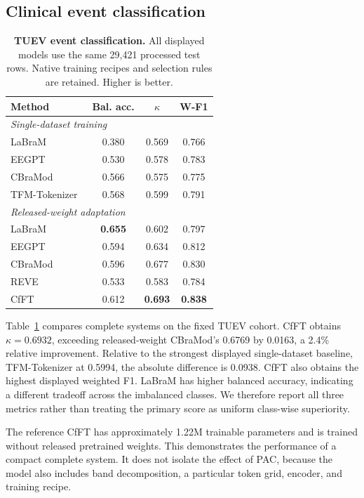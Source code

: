 \documentclass[10pt,twocolumn,letterpaper]{article}
\newcommand{\TableStyle}{\fontsize{8}{9.5}\selectfont\setlength{\tabcolsep}{3pt}\renewcommand{\arraystretch}{1.10}}
\begin{document}
\subsection{Clinical event classification}
\label{sec:main-results}
\begin{table}[t]
\centering\TableStyle
\caption{\textbf{TUEV event classification.} All displayed models use the
same 29,421 processed test rows. Native training recipes and selection
rules are retained. Higher is better.}
\label{tab:tuev}
\begin{tabular*}{\linewidth}{@{\extracolsep{\fill}}lccc@{}}
\toprule
Method & Bal. acc. & $\kappa$ & W-F1\\
\midrule
\multicolumn{4}{l}{\textit{Single-dataset training}}\\
LaBraM~\citep{jiang2024labram} & 0.380 & 0.569 & 0.766\\
EEGPT~\citep{wang2024eegpt} & 0.530 & 0.578 & 0.783\\
CBraMod~\citep{wang2025cbramod} & 0.566 & 0.575 & 0.775\\
TFM-Tokenizer~\citep{pradeepkumar2026tfm} & 0.568 & 0.599 & 0.791\\
\midrule
\multicolumn{4}{l}{\textit{Released-weight adaptation}}\\
LaBraM~\citep{jiang2024labram} & \textbf{0.655} & 0.602 & 0.797\\
EEGPT~\citep{wang2024eegpt} & 0.594 & 0.634 & 0.812\\
CBraMod~\citep{wang2025cbramod} & 0.596 & 0.677 & 0.830\\
REVE~\citep{elouahidi2025reve} & 0.533 & 0.583 & 0.784\\
\midrule
CfFT & 0.612 & \textbf{0.693} & \textbf{0.838}\\
\bottomrule
\end{tabular*}
\end{table}

Table~\ref{tab:tuev} compares complete systems on the fixed TUEV cohort.
CfFT obtains $\kappa=0.6932$, exceeding released-weight CBraMod's
0.6769 by 0.0163, a 2.4\% relative improvement. Relative to the strongest
displayed single-dataset baseline, TFM-Tokenizer at 0.5994, the absolute
difference is 0.0938. CfFT also obtains the highest displayed weighted
F1. LaBraM has higher balanced accuracy, indicating a different tradeoff
across the imbalanced classes. We therefore report all three metrics
rather than treating the primary score as uniform class-wise superiority.

The reference CfFT has approximately 1.22M trainable parameters and is
trained without released pretrained weights. This demonstrates the
performance of a compact complete system. It does not isolate the
effect of PAC, because the model also includes band decomposition,
a particular token grid, encoder, and training recipe.
\end{document}
